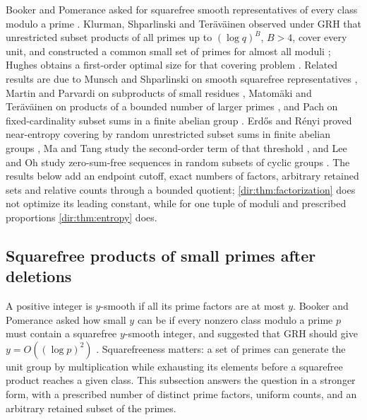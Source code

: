 Booker and Pomerance asked for squarefree smooth representatives of every class modulo a prime
\cite{BookerPomerance2017Squarefree}. Klurman, Shparlinski and Ter\"av\"ainen observed under GRH that
unrestricted subset products of all primes up to $(\log q)^B$, $B>4$, cover every unit, and constructed
a common small set of primes for almost all moduli \cite{KlurmanShparlinskiTeravainen2026Generation};
Hughes obtains a first-order optimal size for that covering problem \cite{Hughes2026Few}. Related
results are due to Munsch and Shparlinski on smooth squarefree representatives
\cite{MunschShparlinski2020Smooth}, Martin and Parvardi on subproducts of small residues
\cite{MartinParvardi2022Subproducts}, Matom\"aki and Ter\"av\"ainen on products of a bounded number of
larger primes \cite{MatomakiTeravainen2023Products}, and Pach on fixed-cardinality subset sums in a
finite abelian group \cite{Pach2025Equidistribution}. Erd\H{o}s and R\'enyi proved near-entropy covering
by random unrestricted subset sums in finite abelian groups \cite{ErdosRenyi1965Probabilistic}, Ma and
Tang study the second-order term of that threshold \cite{MaTang2026Erdos}, and Lee and Oh study
zero-sum-free sequences in random subsets of cyclic groups \cite{LeeOh2023ZeroSum}. The results below
add an endpoint cutoff, exact numbers of factors, arbitrary retained sets and relative counts through a
bounded quotient; \cref{dir:thm:factorization} does not optimize its leading constant, while for one
tuple of moduli and prescribed proportions \cref{dir:thm:entropy} does.

\subsection{Squarefree products of small primes after deletions}\label{dir:sec:products}

A positive integer is $y$-smooth if all its prime factors are at most $y$. Booker and
Pomerance asked how small $y$ can be if every nonzero class modulo a prime $p$ must contain a
squarefree $y$-smooth integer, and suggested that GRH should give $y=O((\log p)^2)$
\cite[\S6]{BookerPomerance2017Squarefree}. Squarefreeness matters: a set of primes can generate
the unit group by multiplication while exhausting its elements before a squarefree product
reaches a given class. This subsection answers the question in a stronger form, with a
prescribed number of distinct prime factors, uniform counts, and an arbitrary retained subset of
the primes.

